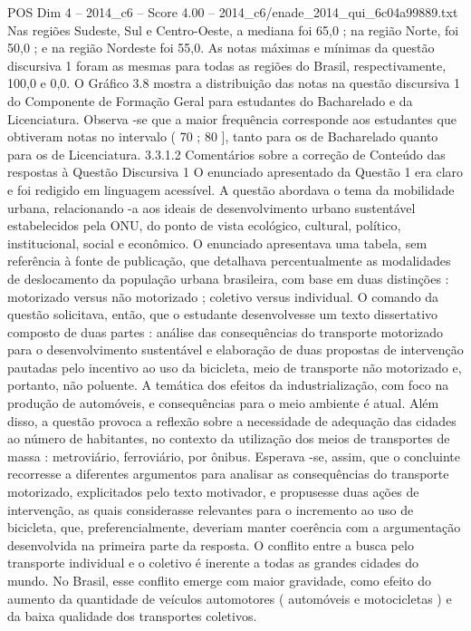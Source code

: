 \begin{textsample}{POS Dim 4 – 2014\_c6 – Score 4.00 – 2014\_c6/enade\_2014\_qui\_6c04a99889.txt}
Nas regiões Sudeste, Sul e Centro-Oeste, a mediana foi 65,0 ; na região Norte, foi 50,0 ; e na região Nordeste foi 55,0.
As notas máximas e mínimas da questão discursiva 1 foram as mesmas para todas as regiões do Brasil, respectivamente, 100,0 e 0,0.
O Gráfico 3.8 mostra a distribuição das notas na questão discursiva 1 do Componente de Formação Geral para estudantes do Bacharelado e da Licenciatura.
Observa -se que a maior frequência corresponde aos estudantes que obtiveram notas no intervalo ( 70 ; 80 ], tanto para os de Bacharelado quanto para os de Licenciatura. 3.3.1.2 Comentários sobre a correção de Conteúdo das respostas à Questão Discursiva 1 O enunciado apresentado da Questão 1 era claro e foi redigido em linguagem acessível.
A questão abordava o tema da mobilidade urbana, relacionando -a aos ideais de desenvolvimento urbano sustentável estabelecidos pela ONU, do ponto de vista ecológico, cultural, político, institucional, social e econômico.
O enunciado apresentava uma tabela, sem referência à fonte de publicação, que detalhava percentualmente as modalidades de deslocamento da população urbana brasileira, com base em duas distinções : motorizado versus não motorizado ; coletivo versus individual.
O comando da questão solicitava, então, que o estudante desenvolvesse um texto dissertativo composto de duas partes : análise das consequências do transporte motorizado para o desenvolvimento sustentável e elaboração de duas propostas de intervenção pautadas pelo incentivo ao uso da bicicleta, meio de transporte não motorizado e, portanto, não poluente.
A temática dos efeitos da industrialização, com foco na produção de automóveis, e consequências para o meio ambiente é atual.
Além disso, a questão provoca a reflexão sobre a necessidade de adequação das cidades ao número de habitantes, no contexto da utilização dos meios de transportes de massa : metroviário, ferroviário, por ônibus.
Esperava -se, assim, que o concluinte recorresse a diferentes argumentos para analisar as consequências do transporte motorizado, explicitados pelo texto motivador, e propusesse duas ações de intervenção, as quais considerasse relevantes para o incremento ao uso de bicicleta, que, preferencialmente, deveriam manter coerência com a argumentação desenvolvida na primeira parte da resposta.
O conflito entre a busca pelo transporte individual e o coletivo é inerente a todas as grandes cidades do mundo.
No Brasil, esse conflito emerge com maior gravidade, como efeito do aumento da quantidade de veículos automotores ( automóveis e motocicletas ) e da baixa qualidade dos transportes coletivos.

\end{textsample}
